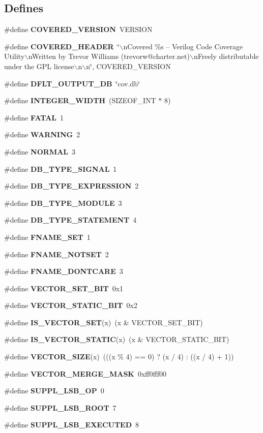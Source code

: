 \subsection*{Defines}
\begin{CompactItemize}
\item 
\#define {\bf COVERED\_\-VERSION}\ VERSION
\item 
\#define {\bf COVERED\_\-HEADER}\ \char`\"{}$\backslash$n\-Covered \%s -- Verilog Code Coverage Utility$\backslash$n\-Written by Trevor Williams  (trevorw@charter.net)$\backslash$n\-Freely distributable under the GPL license$\backslash$n$\backslash$n\char`\"{}, COVERED\_\-VERSION
\item 
\#define {\bf DFLT\_\-OUTPUT\_\-DB}\ \char`\"{}cov.db\char`\"{}
\item 
\#define {\bf INTEGER\_\-WIDTH}\ (SIZEOF\_\-INT $\ast$ 8)
\item 
\#define {\bf FATAL}\ 1
\item 
\#define {\bf WARNING}\ 2
\item 
\#define {\bf NORMAL}\ 3
\item 
\#define {\bf DB\_\-TYPE\_\-SIGNAL}\ 1
\item 
\#define {\bf DB\_\-TYPE\_\-EXPRESSION}\ 2
\item 
\#define {\bf DB\_\-TYPE\_\-MODULE}\ 3
\item 
\#define {\bf DB\_\-TYPE\_\-STATEMENT}\ 4
\item 
\#define {\bf FNAME\_\-SET}\ 1
\item 
\#define {\bf FNAME\_\-NOTSET}\ 2
\item 
\#define {\bf FNAME\_\-DONTCARE}\ 3
\item 
\#define {\bf VECTOR\_\-SET\_\-BIT}\ 0x1
\item 
\#define {\bf VECTOR\_\-STATIC\_\-BIT}\ 0x2
\item 
\#define {\bf IS\_\-VECTOR\_\-SET}(x)\ (x \& VECTOR\_\-SET\_\-BIT)
\item 
\#define {\bf IS\_\-VECTOR\_\-STATIC}(x)\ (x \& VECTOR\_\-STATIC\_\-BIT)
\item 
\#define {\bf VECTOR\_\-SIZE}(x)\ (((x \% 4) == 0) ? (x / 4) : ((x / 4) + 1))
\item 
\#define {\bf VECTOR\_\-MERGE\_\-MASK}\ 0xff0fff00
\item 
\#define {\bf SUPPL\_\-LSB\_\-OP}\ 0
\item 
\#define {\bf SUPPL\_\-LSB\_\-ROOT}\ 7
\item 
\#define {\bf SUPPL\_\-LSB\_\-EXECUTED}\ 8
\item 

\end{CompactItemize}
